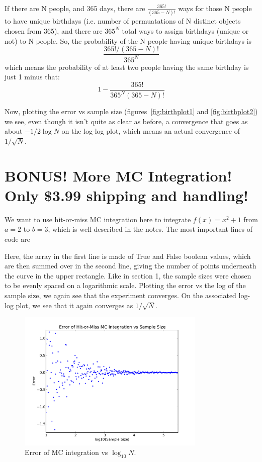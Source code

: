 \documentclass[11pt,letterpaper]{article}
\begin{document}
If there are N people, and 365 days, there are $ \frac{365!}{(365-N)!} $
ways for those N people to have unique birthdays (i.e. number of permuatations
of N distinct objects chosen from 365), and there are $365^N$ total ways to 
assign birthdays (unique or not) to N people. So, the probability of the N
people having unique birthdays is 
$$ \frac{365! / (365-N)!}{365^N}$$
which means the probability of at least two people having the same birthday
is just 1 minus that:
$$ 1 - \frac{365!}{365^{N}(365-N)!} $$

Now, plotting the error vs sample size 
(figures~\ref{fig:birthplot1} and \ref{fig:birthplot2})
we see, even though it isn't quite as clear as before, 
a convergence that goes as about $-1/2 \log N$ on the log-log plot, 
which means an actual convergence of $1/\sqrt{N}$.


\section{BONUS! More MC Integration! Only \$3.99 shipping and handling!}

We want to use hit-or-miss MC integration here to integrate $f(x) = x^2 + 1$ from 
$a = 2$ to $b = 3$, which is well described in the notes. The most important 
lines of code are 

Here, the array in the first line is made of True and False boolean values,
which are then summed over in the second line, giving the number of points
underneath the curve in the upper rectangle. Like in section 1, the sample sizes
were chosen to be evenly spaced on a logarithmic scale. Plotting the error vs the 
log of the sample size, we again see that the experiment converges. On the 
associated log-log plot, we see that it again converges as $1/\sqrt{N}$.

\begin{figure}[bth]
\centering
\includegraphics[width=0.8\textwidth]{MCint_err_plot.pdf}
\caption{Error of MC integration vs $\log_{10} N$.}
\label{fig:intplot1}
\end{figure}
\end{document}
